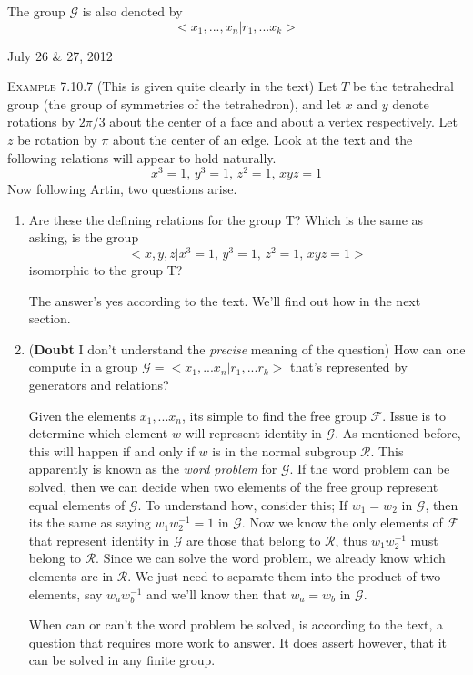 \documentclass[12pt]{article}
\begin{document}
\par
The group $\mathcal G$ is also denoted by
\begin{equation*}
<x_{1},...,x_{n}|r_{1},...x_{k}>
\end{equation*}
\begin{flushright} {\small July 26 \& 27, 2012} \end{flushright}
\textsc {Example 7.10.7} {\small (This is given quite clearly in the text) } Let $T$ be the tetrahedral group (the group of symmetries of the tetrahedron), and let $x$ and $y$ denote rotations by $2\pi /3$ about the center of a face and about a vertex respectively. Let $z$ be rotation by $\pi$ about the center of an edge. Look at the text and the following relations will appear to hold naturally.
\begin{equation*}
x^{3}=1,\,y^{3}=1,\,z^{2}=1,\,xyz=1
\end{equation*}
Now following Artin, two questions arise.
\begin{enumerate}
\item Are these the defining relations for the group T? Which is the same as asking, is the group
\begin{equation*}
<x,y,z|x^{3}=1,\,y^{3}=1,\,z^{2}=1,\,xyz=1>
\end{equation*}
isomorphic to the group T?
\par
The answer's yes according to the text. We'll find out how in the next section.
\item {\small ({\bf Doubt} I don't understand the \emph {precise} meaning of the question)} How can one compute in a group ${\mathcal G} = <x_{1},...x_{n} | r_{1},...r_{k}>$ that's represented by generators and relations?
\par
Given the elements $x_{1},...x_{n}$, its simple to find the free group $\mathcal F$. Issue is to determine which element $w$ will represent identity in $\mathcal G$. As mentioned before, this will happen if and only if $w$ is in the normal subgroup $\mathcal R$. This apparently is known as the \emph {word problem} for $\mathcal G$. If the word problem can be solved, then we can decide when two elements of the free group represent equal elements of $\mathcal G$. To understand how, consider this; If $w_{1}=w_{2}$ in $\mathcal G$, then its the same as saying $w_{1}w_{2}^{-1}=1$ in $\mathcal G$. Now we know the only elements of $\mathcal F$ that represent identity in $\mathcal G$ are those that belong to $\mathcal R$, thus $w_{1}w_{2}^{-1}$ must belong to $\mathcal R$. Since we can solve the word problem, we already know which elements are in $\mathcal R$. We just need to separate them into the product of two elements, say $w_{a}w_{b}^{-1}$ and we'll know then that $w_{a}=w_{b}$ in $\mathcal G$.
\par 
When can or can't the word problem be solved, is according to the text, a question that requires more work to answer. It does assert however, that it can be solved in any finite group.
\end{enumerate}
\end{document}
